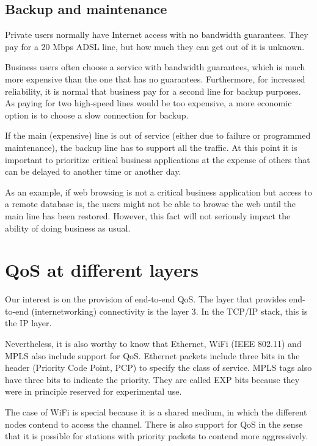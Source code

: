 \subsection{Backup and maintenance}

Private users normally have Internet access with no bandwidth guarantees.
They pay for a 20 Mbps ADSL line, but how much they can get out of it is unknown.

Business users often choose a service with bandwidth guarantees, which is much more expensive than the one that has no guarantees.
Furthermore, for increased reliability, it is normal that business pay for a second line for backup purposes.
As paying for two high-speed lines would be too expensive, a more economic option is to choose a slow connection for backup.

If the main (expensive) line is out of service (either due to failure or programmed maintenance), the backup line has to support all the traffic.
At this point it is important to prioritize critical business applications at the expense of others that can be delayed to another time or another day.

As an example, if web browsing is not a critical business application but access to a remote database is, the users might not be able to browse the web until the main line has been restored.
However, this fact will not seriously impact the ability of doing business as usual.


\section{QoS at different layers}
Our interest is on the provision of end-to-end QoS.
The layer that provides end-to-end (internetworking) connectivity is the layer 3.
In the TCP/IP stack, this is the IP layer.

Nevertheless, it is also worthy to know that Ethernet, WiFi (IEEE 802.11) and MPLS also include support for QoS.
Ethernet packets include three bits in the header (Priority Code Point, PCP) to specify the class of service.
MPLS tags also have three bits to indicate the priority. 
They are called EXP bits because they were in principle reserved for experimental use.

The case of WiFi is special because it is a shared medium, in which the different nodes contend to access the channel.
There is also support for QoS in the sense that it is possible for stations with priority packets to contend more aggressively.

